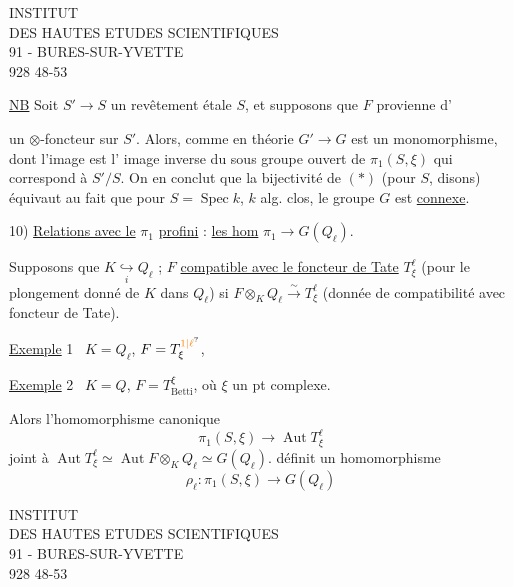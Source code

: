 INSTITUT\\
DES HAUTES ETUDES SCIENTIFIQUES\\
91 - BURES-SUR-YVETTE\\
928 48-53

\uline{NB} Soit $S'\longrightarrow{}S$ un revêtement étale  $S$,  et supposons que $F$ provienne d'

un  $\otimes$-foncteur  sur $S'$. Alors, comme en théorie  $G'\longrightarrow G$ est un monomorphisme, dont l'image est l' image inverse  du sous groupe ouvert de $\pi_1(S,\xi)$ qui correspond à $S'/S$. On en conclut que la bijectivité de $(*)$  (pour  $S$, disons) équivaut au fait que pour $S=\operatorname{Spec} k$, $k$ alg. clos, le  groupe $G$ est \uline{connexe}.

10) \uline{Relations avec le} $\pi_1$ \uline{profini} : \uline{les hom} $\pi_1\to G(Q_\ell)$.

Supposons  que $K\underset{i}{\hookrightarrow}Q_\ell$ ;  $F$   \uline{compatible avec le foncteur de Tate} $T^\ell_\xi$ (pour le plongement donné de $K$ dans $Q_\ell$) si $F\otimes_K Q_\ell\xrightarrow{\sim}T^\ell_\xi$ (donnée de compatibilité avec foncteur de Tate).

\uline{Exemple} 1 \ $K=Q_\ell$, $F=T^{\unsure{1|\ell}}_\xi$,

\uline{Exemple} 2 \ $K=Q$, $F=T_{\mathrm{Betti}}^\xi$, où $\xi$ un pt complexe.

Alors  l'homomorphisme canonique
\[
\pi_1(S,\xi)\to\operatorname{Aut}T^\ell_\xi
\]
 joint à $\operatorname{Aut}T^\ell_\xi\simeq\operatorname{Aut}F\otimes_{K}Q_\ell\simeq G(Q_\ell)$.
définit un homomorphisme
\[
\boxed{\rho_\ell:\pi_1(S,\xi)\longrightarrow G(Q_\ell)}
\]

INSTITUT\\
DES HAUTES ETUDES SCIENTIFIQUES\\
91 - BURES-SUR-YVETTE\\
928 48-53

